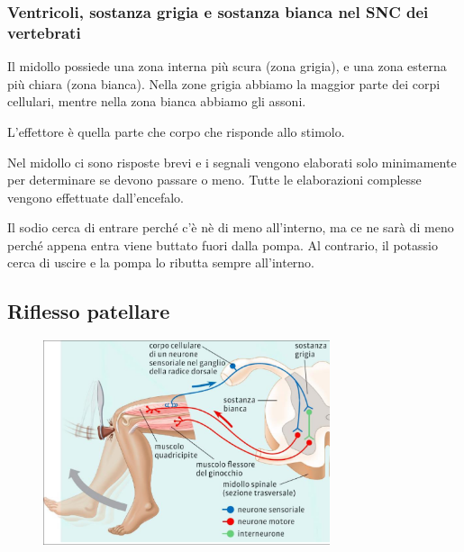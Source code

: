 \documentclass[a4paper]{article}
\begin{document}
\subsubsection{Ventricoli, sostanza grigia e sostanza bianca nel SNC dei vertebrati}

Il midollo possiede una zona interna più scura (zona grigia), e una zona esterna più chiara
(zona bianca). Nella zone grigia abbiamo la maggior parte dei corpi cellulari,
mentre nella zona bianca abbiamo gli assoni.

L'effettore è quella parte che corpo che risponde allo stimolo.

Nel midollo ci sono risposte brevi e i segnali vengono elaborati solo minimamente per determinare se devono passare o meno.
Tutte le elaborazioni complesse vengono effettuate dall'encefalo.

Il sodio cerca di entrare perché c'è nè di meno all'interno, ma ce ne sarà di meno perché appena entra
viene buttato fuori dalla pompa.
Al contrario, il potassio cerca di uscire e la pompa lo ributta sempre all'interno.


\pagebreak

\subsection{Riflesso patellare}


\vspace{0.5cm}

\begin{center}
\begin{figure}[ht]
    \centering
    \includegraphics[width=0.75\textwidth]{./patellare.png}
\end{figure}
\end{center}
\end{document}
